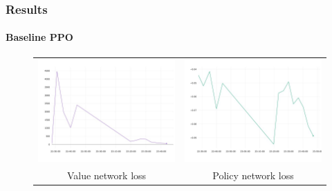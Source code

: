 \documentclass{beamer}
\begin{document}
	\begin{frame}
		\frametitle{Results}
		\framesubtitle{Baseline PPO}
		\begin{figure}
			\begin{tabular}{cc}
				\includegraphics[scale=0.15]{graph-value-loss.jpeg} & \includegraphics[scale=0.15]{graph-policy-loss.jpeg} \\
				{\small Value network loss} & {\small Policy network loss} \\
				

\end{tabular}
\end{figure}
\end{frame}
\end{document}
